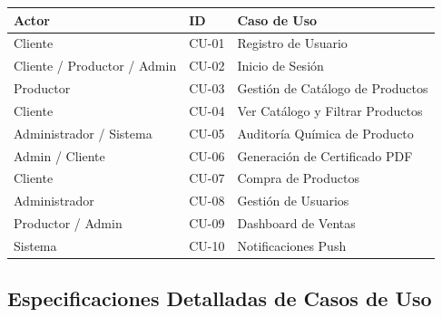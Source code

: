 \documentclass[12pt,a4paper]{article}
\begin{document}
\begin{center}
\begin{tabular}{|L{4cm}|C{2cm}|L{8cm}|}
\hline
{}
\color{white}\textbf{Actor} & \color{white}\textbf{ID} & \color{white}\textbf{Caso de Uso} \\
\hline
Cliente                     & CU-01 & Registro de Usuario \\
\hline
Cliente / Productor / Admin & CU-02 & Inicio de Sesi\'on \\
\hline
Productor                   & CU-03 & Gesti\'on de Cat\'alogo de Productos \\
\hline
Cliente                     & CU-04 & Ver Cat\'alogo y Filtrar Productos \\
\hline
Administrador / Sistema     & CU-05 & Auditor\'ia Qu\'imica de Producto \\
\hline
Admin / Cliente             & CU-06 & Generaci\'on de Certificado PDF \\
\hline
Cliente                     & CU-07 & Compra de Productos \\
\hline
Administrador               & CU-08 & Gesti\'on de Usuarios \\
\hline
Productor / Admin           & CU-09 & Dashboard de Ventas \\
\hline
Sistema                     & CU-10 & Notificaciones Push \\
\hline
\end{tabular}
\end{center}

\subsection{Especificaciones Detalladas de Casos de Uso}
\end{document}

